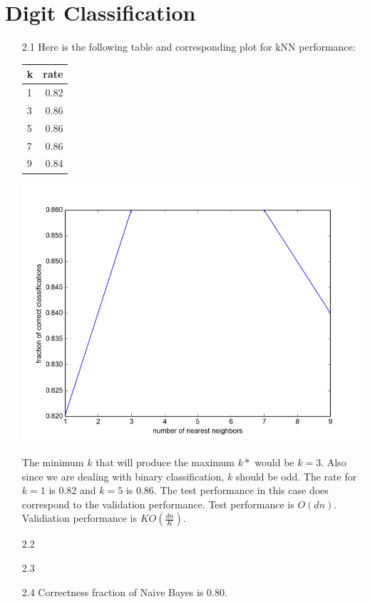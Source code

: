 \documentclass[letterpaper, 12pt]{article}
\begin{document}
\section*{Digit Classification}
\begin{itemize}
	\item[2.1]
		Here is the following table and corresponding plot for kNN performance: \\
		\begin{center}
			\begin{tabular}{ l | r }
				k &rate\\
				\hline
				1 &0.82\\
				3 &0.86\\
				5 &0.86\\
				7 &0.86\\
				9 &0.84
			\end{tabular}
		\end{center}
		\begin{center}
			\includegraphics[scale=0.25]{figure_1.png}
		\end{center}

		The minimum $k$ that will produce the maximum $k*$ would be $k = 3$. Also since we are dealing with binary classification, $k$ should be odd. The rate for $k = 1$ is 0.82 and $k = 5$ is 0.86. The test performance in this case does correspond to the validation performance. Test performance is $O(dn)$. Validiation performance is $KO(\frac{dn}{K})$.

	\item[2.2]
	\item[2.3]
	\newpage
	\item[2.4]
		Correctness fraction of Naive Bayes is 0.80. \\


\end{itemize}
\end{document}
